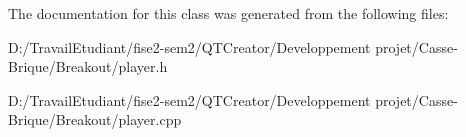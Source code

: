 The documentation for this class was generated from the following files\+:\begin{DoxyCompactItemize}
\item 
D\+:/\+Travail\+Etudiant/fise2-\/sem2/\+Q\+T\+Creator/\+Developpement projet/\+Casse-\/\+Brique/\+Breakout/player.\+h\item 
D\+:/\+Travail\+Etudiant/fise2-\/sem2/\+Q\+T\+Creator/\+Developpement projet/\+Casse-\/\+Brique/\+Breakout/player.\+cpp\end{DoxyCompactItemize}

